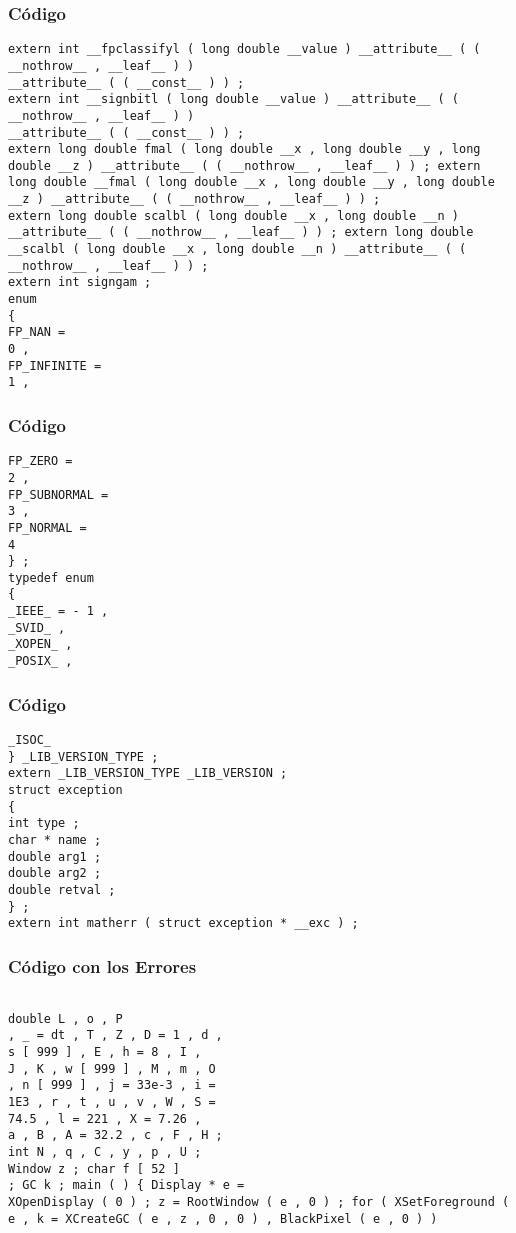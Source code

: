 \documentclass{beamer}
\begin{document}
\begin{frame}[fragile]
\frametitle{C\'odigo}
\begin{verbatim}
extern int __fpclassifyl ( long double __value ) __attribute__ ( ( __nothrow__ , __leaf__ ) ) 
__attribute__ ( ( __const__ ) ) ; 
extern int __signbitl ( long double __value ) __attribute__ ( ( __nothrow__ , __leaf__ ) ) 
__attribute__ ( ( __const__ ) ) ; 
extern long double fmal ( long double __x , long double __y , long double __z ) __attribute__ ( ( __nothrow__ , __leaf__ ) ) ; extern long double __fmal ( long double __x , long double __y , long double __z ) __attribute__ ( ( __nothrow__ , __leaf__ ) ) ; 
extern long double scalbl ( long double __x , long double __n ) __attribute__ ( ( __nothrow__ , __leaf__ ) ) ; extern long double __scalbl ( long double __x , long double __n ) __attribute__ ( ( __nothrow__ , __leaf__ ) ) ; 
extern int signgam ; 
enum 
{ 
FP_NAN = 
0 , 
FP_INFINITE = 
1 , 
\end{verbatim}
\end{frame}
\begin{frame}[fragile]
\frametitle{C\'odigo}
\begin{verbatim}
FP_ZERO = 
2 , 
FP_SUBNORMAL = 
3 , 
FP_NORMAL = 
4 
} ; 
typedef enum 
{ 
_IEEE_ = - 1 , 
_SVID_ , 
_XOPEN_ , 
_POSIX_ , 
\end{verbatim}
\end{frame}
\begin{frame}[fragile]
\frametitle{C\'odigo}
\begin{verbatim}
_ISOC_ 
} _LIB_VERSION_TYPE ; 
extern _LIB_VERSION_TYPE _LIB_VERSION ; 
struct exception 
{ 
int type ; 
char * name ; 
double arg1 ; 
double arg2 ; 
double retval ; 
} ; 
extern int matherr ( struct exception * __exc ) ; \end{verbatim}
\end{frame}
\begin{frame}[fragile]
\frametitle{C\'odigo con los Errores}
\begin{verbatim}

double L , o , P 
, _ = dt , T , Z , D = 1 , d , 
s [ 999 ] , E , h = 8 , I , 
J , K , w [ 999 ] , M , m , O 
, n [ 999 ] , j = 33e-3 , i = 
1E3 , r , t , u , v , W , S = 
74.5 , l = 221 , X = 7.26 , 
a , B , A = 32.2 , c , F , H ; 
int N , q , C , y , p , U ; 
Window z ; char f [ 52 ] 
; GC k ; main ( ) { Display * e = 
XOpenDisplay ( 0 ) ; z = RootWindow ( e , 0 ) ; for ( XSetForeground ( e , k = XCreateGC ( e , z , 0 , 0 ) , BlackPixel ( e , 0 ) ) 
\end{verbatim}
\end{frame}
\end{document}
